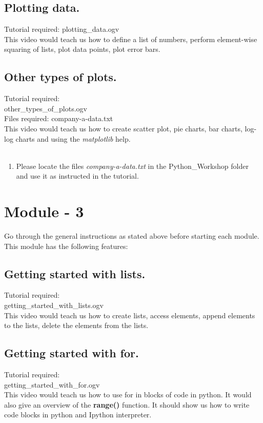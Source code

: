 \documentclass[11pt,twocolumn]{article}
\newenvironment{enumcpt}{\begin{enumerate} \topsep 0pt \partopsep 0pt 
                        \parsep 0pt
                        \itemsep 0pt \leftmargin -1in \rightmargin 0pt
                        }{\end{enumerate}}
\begin{document}
  \subsection{Plotting data.}
  Tutorial required: plotting\_data.ogv \\
    This video would teach us how to define a list of numbers, perform element-wise squaring of lists, plot data points, plot error bars. 
    \subsection{Other types of plots.}
    Tutorial required:\\ other\_types\_of\_plots.ogv \\
    Files required: company-a-data.txt \\
    This video would teach us how to create scatter plot, pie charts, bar charts, log-log charts and using the \emph{matplotlib} help.\\ \\
\begin{enumcpt}
\item Please locate the files \emph{company-a-data.txt} in the Python\_Workshop folder and use it
      as instructed in the tutorial. 
\end{enumcpt}
  
\section{Module - 3}
Go through the general instructions as stated above before starting each module.\\
This module has the following features:
\subsection{Getting started with lists.}
Tutorial required: \\getting\_started\_with\_lists.ogv \\
This video would teach us how to create lists, access elements, append elements to the lists, delete the elements from the lists. 
\subsection{Getting started with for.}
Tutorial required: \\getting\_started\_with\_for.ogv \\
This video would teach us how to use for in blocks of code in python. It would also give an overview of the \textbf{range()} function. It should show us how to write code blocks in python and Ipython interpreter. 
\end{document}

